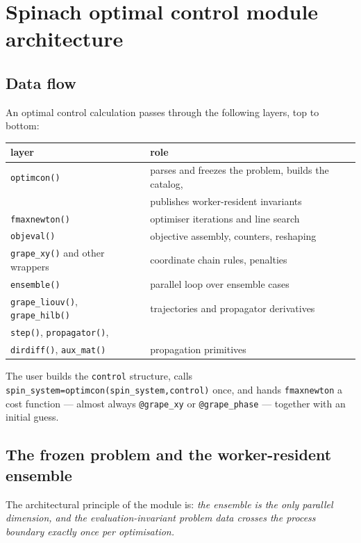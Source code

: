\documentclass[11pt,a4paper]{article}
\newcommand{\code}[1]{\texttt{#1}}
\begin{document}
\section{Spinach optimal control module architecture}
\label{sec:architecture}

\subsection{Data flow}

An optimal control calculation passes through the following layers, top
to bottom:
\begin{center}
\begin{tabular}{ll}
\toprule
layer & role \\
\midrule
\code{optimcon()} & parses and freezes the problem, builds the catalog,\\
                  & publishes worker-resident invariants\\
\code{fmaxnewton()} & optimiser iterations and line search\\
\code{objeval()} & objective assembly, counters, reshaping\\
\code{grape\_xy()} and other wrappers
                  & coordinate chain rules, penalties\\
\code{ensemble()} & parallel loop over ensemble cases\\
\code{grape\_liouv()}, \code{grape\_hilb()} & trajectories and
                    propagator derivatives\\
\code{step()}, \code{propagator()}, & \\
\code{dirdiff()}, \code{aux\_mat()} & propagation primitives\\
\bottomrule
\end{tabular}
\end{center}
The user builds the \code{control} structure, calls
\code{spin\_system=optimcon(spin\_system,control)} once, and hands
\code{fmaxnewton} a cost function --- almost always \code{@grape\_xy} or
\code{@grape\_phase} --- together with an initial guess.

\subsection{The frozen problem and the worker-resident ensemble}

The architectural principle of the module is:
\emph{the ensemble is the only parallel dimension, and the
evaluation-invariant problem data crosses the process boundary exactly
once per optimisation.}
\end{document}
